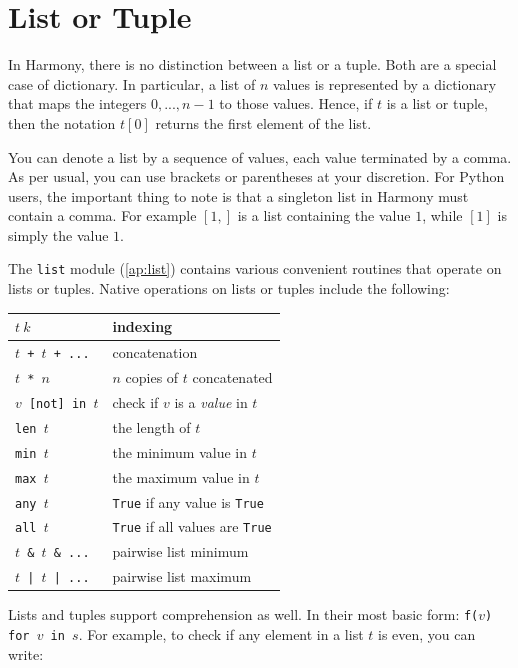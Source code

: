 \documentclass{report}
\begin{document}
\section{List or Tuple}

In Harmony, there is no distinction between a list or a tuple.
Both are a special case of dictionary.  In particular, a list of
$n$ values is represented by a dictionary that maps the integers
$0, ..., n-1$ to those values.  Hence, if $t$ is a list or tuple,
then the notation $t[0]$ returns the first element of the list.

You can denote a list by a sequence of values, each value terminated
by a comma.  As per usual, you can use brackets or parentheses
at your discretion.  For Python users, the important thing to note
is that a singleton list in Harmony must contain a comma.  For
example $[1,]$ is a list containing the value $1$, while $[1]$
is simply the value $1$.

The \texttt{list} module (\autoref{ap:list}) contains various
convenient routines that operate on lists or tuples.
Native operations on lists or tuples include the following:

\begin{center}
\begin{tabular}{|l|l|}
\hline
\texttt{$t~k$} & indexing \\
\hline
\texttt{$t$ + $t$ + ...} & concatenation \\
\hline
\texttt{$t$ * $n$} & $n$ copies of $t$ concatenated \\
\hline
\texttt{$v$ [not] in $t$} & check if $v$ is a \emph{value} in $t$ \\
\hline
\texttt{len $t$} & the length of $t$ \\
\hline
\texttt{min $t$} & the minimum value in $t$ \\
\hline
\texttt{max $t$} & the maximum value in $t$ \\
\hline
\texttt{any $t$} & \texttt{True} if any value is \texttt{True} \\
\hline
\texttt{all $t$} & \texttt{True} if all values are \texttt{True} \\
\hline
\texttt{$t$ \& $t$ \& ...} & pairwise list minimum \\
\hline
\texttt{$t$ | $t$ | ...} & pairwise list maximum \\
\hline
\end{tabular}
\end{center}

Lists and tuples support comprehension as well.
In their most basic form: \texttt{f($v$) for $v$ in $s$}.
For example, to check if any element in a list $t$ is even, you
can write:
\end{document}
